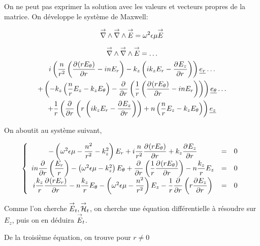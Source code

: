 
On ne peut pas exprimer la solution avec les valeurs et vecteurs propres de la matrice. 
On développe le système de Maxwell:

\begin{equation}
    \vrot \vrot \vE = \w^2\eps\mu \vE
\end{equation}

\begin{multline}
    \vrot \vrot \vE = \dots\\
    i\left(\frac{n}{r^2}\left(\ddr{r}{(rE_\theta)} - inE_r\right) - k_z\left(ik_zE_r - \ddr{r}{E_z}\right)\right)    \v{e_r} \dots\\ 
    + \left(-k_z\left(\frac{n}{r}E_z - k_zE_\theta\right) -\ddr{r}{}\left(\frac{1}{r}\left(\ddr{r}{(rE_\theta)}-inE_r\right)\right)\right)    \v{e_\theta} \dots\\
    + \frac{1}{r}\left(\ddr{r}{} \left(r\left(ik_zE_r - \ddr{r}{E_z}\right)\right) + n \left(\frac{n}{r}E_z - k_zE_\theta\right)\right) \v{e_z}
\end{multline}

On aboutit au système suivant,

\begin{equation}
    \left\lbrace
    \begin{array}{ccc}
        -\left(\w^2\eps\mu -\frac{n^2}{r^2}  - k_z^2\right)E_r  +i\frac{n}{r^2}\ddr{r}{(rE_\theta)}  +k_z\ddr{r}{E_z} & = & 0\\
        in\ddr{r}{}\left(\frac{E_r}{r}\right) -\left(\w^2\eps\mu - k_z^2\right)E_\theta + \ddr{r}{}\left(\frac{1}{r}\ddr{r}{(rE_\theta)}\right)  - n\frac{k_z}{r}E_z & = & 0\\
        i\frac{k_z}{r}\ddr{r}{(rE_r)}  - n\frac{k_z}{r}E_\theta  -\left(\w^2\eps\mu - \frac{n^2}{r^2} \right)E_z - \frac{1}{r}\ddr{r}{}\left(r\ddr{r}{E_z}\right) & = & 0
    \end{array}
    \right.
\end{equation}

Comme l'on cherche $\vE_t, \vH_t$, on cherche une équation différentielle à résoudre sur $E_z$, puis on en déduira $\vE_t$.

De la troisième  équation, on trouve pour $r\not=0$

